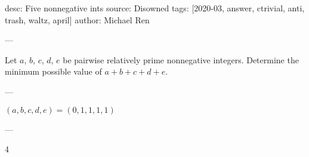 desc: Five nonnegative ints
source: Disowned
tags: [2020-03, answer, ctrivial, anti, trash, waltz, april]
author: Michael Ren

---

Let $a$, $b$, $c$, $d$, $e$ be pairwise relatively prime nonnegative integers. Determine the minimum possible value of $a+b+c+d+e$.

---

$(a,b,c,d,e)=(0,1,1,1,1)$

---

4
